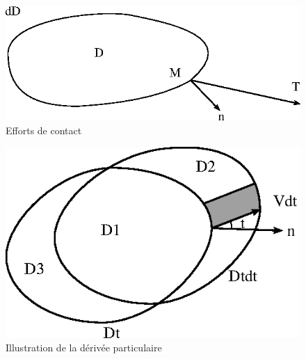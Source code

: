 \documentclass[a4paper,dvips]{article}
\begin{document}
\begin{figure}[ht]
    \begin{center}
        \includegraphics{../images/T1_Ch01-0001}
    \end{center}
    \caption{Efforts de contact}
    \label{fig:T1_Ch01-0001}
\end{figure}
\begin{figure}[ht]
    \begin{center}
        \includegraphics{../images/T1_Ch01-0002}
    \end{center}
    \caption{Illustration de la dérivée particulaire}  
    \label{fig:T1_Ch01-0002}
\end{figure}
\end{document}
